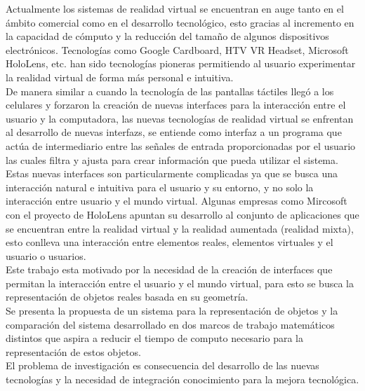 Actualmente los sistemas de \gls{realidad virtual} se encuentran en auge tanto en el ámbito comercial como en el desarrollo tecnológico, esto gracias al incremento en la capacidad de cómputo y la reducción del tamaño de algunos dispositivos electrónicos. Tecnologías como Google Cardboard, HTV VR Headset, Microsoft HoloLens, etc. han sido tecnologías pioneras permitiendo al usuario experimentar la realidad virtual de forma más personal e intuitiva.\\

De manera similar a cuando la tecnología de las pantallas táctiles llegó a los celulares y forzaron la creación de nuevas interfaces para la interacción entre el usuario y la computadora, las nuevas tecnologías de realidad virtual se enfrentan al desarrollo de nuevas \glspl{interfaz}, se entiende como interfaz a un programa que actúa de intermediario entre las señales de entrada proporcionadas por el usuario las cuales filtra y ajusta para crear información que pueda utilizar el sistema.\\

Estas nuevas interfaces son particularmente complicadas ya que se busca una interacción natural e intuitiva para el usuario y su entorno, y no solo la interacción entre usuario y el mundo virtual. Algunas empresas como Mircosoft con el proyecto de HoloLens \cite{HoloLens} apuntan su desarrollo al conjunto de aplicaciones que se encuentran entre la realidad virtual y la realidad aumentada (realidad mixta), esto conlleva una interacción entre elementos reales, elementos virtuales y el usuario o usuarios.\\

Este trabajo esta motivado por la necesidad de la creación de interfaces que permitan la interacción entre el usuario y el mundo virtual, para esto se busca la representación de objetos reales basada en su geometría.\\

Se presenta la propuesta de un sistema para la representación de objetos y la comparación del sistema desarrollado en dos marcos de trabajo matemáticos distintos que aspira a reducir el tiempo de computo necesario para la representación de estos objetos.\\

El problema de investigación es consecuencia del desarrollo de las nuevas tecnologías y la necesidad de integración  conocimiento para la mejora tecnológica.\\

